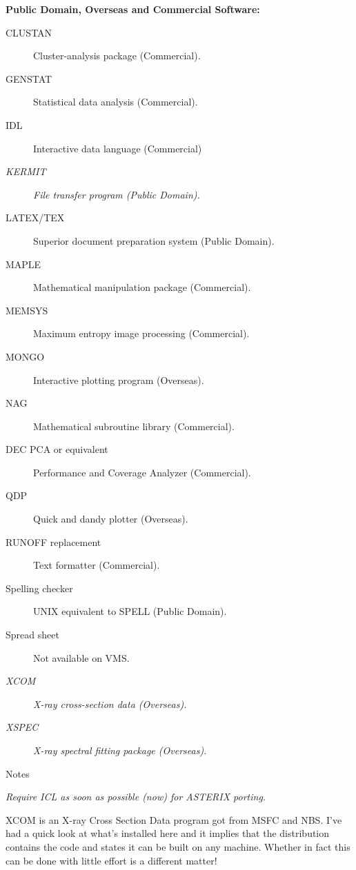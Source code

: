 \vspace{5mm}
\begin{center}
{\bf Public Domain, Overseas and Commercial Software:}
\end{center}

\begin{description}
\item[CLUSTAN] Cluster-analysis package (Commercial).
\item[GENSTAT] Statistical data analysis (Commercial).
\item[IDL] Interactive data language (Commercial)
\item[{\em KERMIT}] {\em File transfer program (Public Domain).}
\item[LATEX/TEX] Superior document preparation system (Public Domain).
\item[MAPLE] Mathematical manipulation package (Commercial).
\item[MEMSYS] Maximum entropy image processing (Commercial).
\item[MONGO] Interactive plotting program (Overseas).
\item[NAG] Mathematical subroutine library (Commercial).
\item[DEC PCA or equivalent] Performance and Coverage Analyzer (Commercial).
\item[QDP] Quick and dandy plotter (Overseas).
\item[RUNOFF replacement] Text formatter (Commercial).
\item[Spelling checker] UNIX equivalent to SPELL (Public Domain).
\item[Spread sheet] Not available on VMS.
\item[{\em XCOM}] {\em X-ray cross-section data (Overseas).}
\item[{\em XSPEC}] {\em X-ray spectral fitting package (Overseas).}
\end{description}


\vspace{5mm}
\begin{center}
{\large\sc Notes}
\end{center}

{\em Require ICL as soon as possible (now) for ASTERIX porting.}

XCOM is an X-ray Cross Section Data program got from MSFC and NBS.
I've had a quick look at what's installed here and it implies that the
distribution contains the code and states it can be built on any machine.
Whether in fact this can be done with little effort is a different matter!


